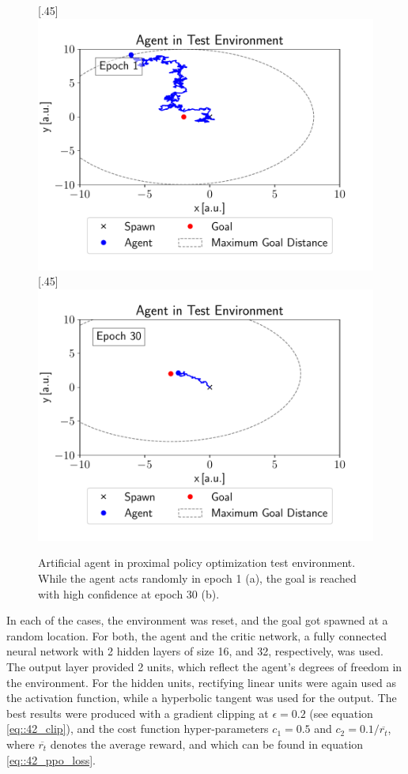 \begin{figure}[h!]
	\centering
	[.45\linewidth]{\includegraphics[scale=.45]{chapters/11_autonomous_walking_experiments/img/epoch_1.pdf}}	
	[.45\linewidth]{\includegraphics[scale=.45]{chapters/11_autonomous_walking_experiments/img/epoch_30.pdf}}
	\caption{Artificial agent in proximal policy optimization test environment. While the agent acts randomly in epoch 1 (a), the goal is reached with high confidence at epoch 30 (b).}	
	\label{fig::1121_ppo_env}
\end{figure} 
In each of the cases, the environment was reset, and the goal got spawned at a random location. For both, the agent and the critic network, a fully connected neural network with 2 hidden layers of size 16, and 32, respectively, was used. The output layer provided 2 units, which reflect the agent's degrees of freedom in the environment. For the hidden units, rectifying linear units were again used as the activation function, while a hyperbolic tangent was used for the output. The best results were produced with a gradient clipping at $\epsilon=0.2$ (see equation \ref{eq::42_clip}), and the cost function hyper-parameters $c_1 = 0.5$ and $c_2 = 0.1/\overline{r_t}$, where $\overline{r_t}$ denotes the average reward, and which can be found in equation \ref{eq::42_ppo_loss}. 

